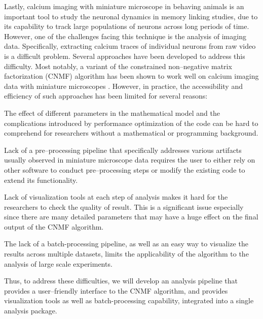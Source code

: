 \documentclass[master.tex]{subfiles}
\begin{document}
Lastly, calcium imaging with miniature microscope in behaving animals is an
important tool to study the neuronal dynamics in memory linking studies, due to
its capability to track large populations of neurons across long periods of
time. However, one of the challenges facing this technique is the analysis of
imaging data. Specifically, extracting calcium traces of individual neurons from
raw video is a difficult problem. Several approaches have been developed to
address this difficulty. Most notably, a variant of the constrained
non--negative matrix factorization (CNMF) algorithm has been shown to work well
on calcium imaging data with miniature microscopes
\cite{pnevmatikakis_simultaneous_2016, zhou_efficient_2016}. However, in
practice, the accessibility and efficiency of such approaches has been limited
for several reasons:
\begin{inparaenum}[a)]
\item The effect of different parameters in the mathematical model and the
  complications introduced by performance optimization of the code can be hard
  to comprehend for researchers without a mathematical or programming
  background.
\item Lack of a pre--processing pipeline that specifically addresses various
  artifacts usually observed in miniature microscope data requires the user to
  either rely on other software to conduct pre--processing steps or modify the
  existing code to extend its functionality.
\item Lack of visualization tools at each step of analysis makes it hard for the
  researchers to check the quality of result. This is a significant issue
  especially since there are many detailed parameters that may have a huge
  effect on the final output of the CNMF algorithm.
\item The lack of a batch-processing pipeline, as well as an easy way to
  visualize the results across multiple datasets, limits the applicability of
  the algorithm to the analysis of large scale experiments.
\end{inparaenum}
Thus, to address these difficulties, we will develop an analysis pipeline that
provides a user--friendly interface to the CNMF algorithm, and provides
visualization tools as well as batch-processing capability, integrated into a
single analysis package.
\end{document}
